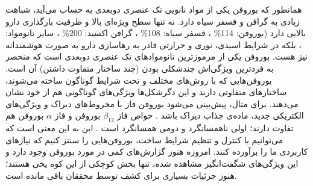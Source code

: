 همانطور که بوروفن یکی از مواد نانویی تک عنصری دوبعدی به حساب می‌آید، شباهت زیادی به گرافن و فسفر سیاه دارد. نه تنها سطح ویژه‌ای بالا و ظرفیت بارگذاری دارو بالایی دارد (بوروفن: 114\% \cite{jiNovelTopDownSynthesis2018}، فسفر سیاه: 108\% \cite{taoBlackPhosphorusNanosheets2017}، گرافن اکسید: 200\% \cite{zhangFunctionalGrapheneOxide2010}، سایر نانومواد: ، بلکه در شرایط اسیدی، نوری و حرارتی قادر به رهاسازی دارو به صورت هوشمندانه نیز هست. بوروفن یکی از مرموزترین نانوموادهای تک عنصری دوبعدی است که منحصر به فردترین ویژگی‌اش چندشکلی بودن (چند ساختار متفاوت داشتن) آن است. بوروفن‌هایی که با روش‌های مختلف و تحت شرایط گوناگون ساخته می‌شوند، ساختارهای متفاوتی دارند و این دگرشکل‌ها ویژگی‌های گوناگونی هم از خود نشان می‌دهند. برای مثال، پیش‌بینی می‌شود بوروفن فاز  با مخروط‌های دیراک و ویژگی‌های الکتریکی جدید، ماده‌ی جذاب دیراک باشد \cite{zhouSemimetallicTwoDimensionalBoron2014}. خواص فاز $\beta_{12}$ بوروفن و فاز $\alpha$ بوروفن هم تفاوت دارند؛ اولی ناهمسانگرد و دومی همسانگرد است \cite{zhouSuperiorLatticeThermal2017, xiaoLatticeThermalConductivity2017}. این به این معنی است که می‌توانیم با کنترل و تنظیم شرایط ساخت، بوروفن‌هایی را سنتز کنیم که نیازهای کاربردی ما را برآورده کنند. امروزه هنوز گزارش‌های کمی در مورد بوروفن وجود دارد و این ویژگی‌های شگفت‌انگیز مشاهده شده، تنها بخش کوچکی از این کوه یخی هستند؛ هنوز جزئیات بسیاری برای کشف توسط محققان باقی مانده است.

